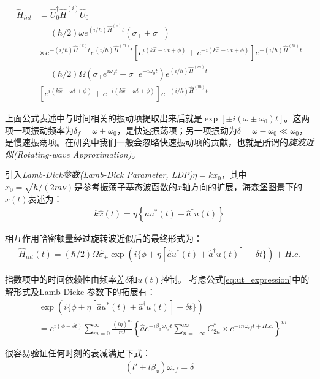 \begin{align}
    \hat{H}_{int} &=\hat{U}_0^\dagger\hat{H}^{(i)}\hat{U}_0\\
    &=(\hbar/2)\omega e^{(i/\hbar)\hat{H}^{(e)}t}(\sigma_++\sigma_-)\\
    &\times e^{-(i/\hbar)\hat{H}^{(e)}t}e^{(i/\hbar)\hat{H}^{(m)}t}\left[e^{i(k\hat{x}-\omega t + \phi)}+e^{-i(k\hat{x}-\omega t + \phi)}\right]e^{-(i/\hbar)\hat{H}^{(m)}t}\\
    &=(\hbar/2)\Omega(\sigma_+e^{i\omega_0 t}+\sigma_-e^{-i\omega_0 t}) e^{(i/\hbar)\hat{H}^{(m)}t} \\
    &\left[e^{i(k\hat{x}-\omega t + \phi)}+e^{-i(k\hat{x}-\omega t + \phi)}\right]e^{-(i/\hbar)\hat{H}^{(m)}t}
\end{align}

上面公式表述中与时间相关的振动项提取出来后就是$\exp[\pm i (\omega\pm \omega_0)t]$。这两项一项振动频率为$\delta_f=\omega+\omega_0$，是快速振荡项；另一项振动为$\delta=\omega-\omega_0\ll \omega_0$，是慢速振荡项。在研究中我们一般会忽略快速振动项的贡献，也就是所谓的\emph{旋波近似(Rotating-wave Approximation)}。

引入\emph{Lamb-Dick参数(Lamb-Dick Parameter, LDP)}$\eta=kx_0$，其中$x_0=\sqrt{\hbar/(2m\nu)}$是参考振荡子基态波函数的$x$轴方向的扩展，海森堡图景下的$\hat{x}(t)$表述为：
\begin{align}
    k\hat{x}(t)=\eta\left\{\hat{a}u^*(t)+\hat{a}^\dagger u(t)\right\}
\end{align}

相互作用哈密顿量经过旋转波近似后的最终形式为：
\begin{align}
    \hat{H}_{int}(t)=(\hbar/2)\Omega\hat{\sigma}_+ \exp(i\{\phi+\eta[\hat{a}u^*(t)+\hat{a}^\dagger u(t)]-\delta t\})+H.c.
\end{align}

指数项中的时间依赖性由频率差$\delta$和$u(t)$控制。
考虑公式\eqref{eq:ut_expression}中的解形式及Lamb-Dicke 参数下的拓展有：
\begin{align}
    &\exp(i\{\phi + \eta [\hat{a}u^*(t)+\hat{a}^\dagger u(t)]-\delta t\})\\
    &=e^{i(\phi-\delta t)}\sum_{m=0}^{\infty} \frac{(i\eta)^m}{m!}\left\{\hat{a}e^{-i\beta_x\omega_{rf}t} \sum_{n=-\infty}^{\infty}C_{2n}^* \times e^{-i n\omega_{rf}t+H.c.}\right\}^m
\end{align}

很容易验证任何时刻的衰减满足下式：
\begin{align}
    (l'+l\beta_x)\omega_{rf}=\delta
\end{align}

